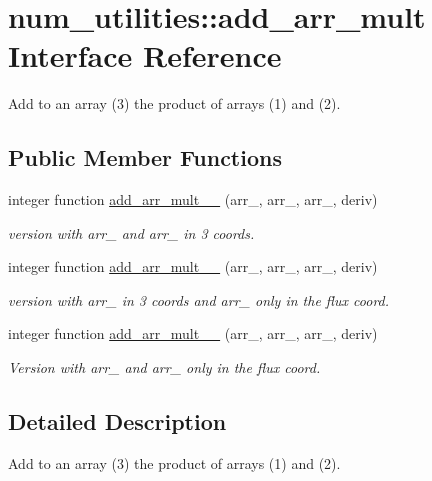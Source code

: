 \hypertarget{interfacenum__utilities_1_1add__arr__mult}{}\section{num\+\_\+utilities\+:\+:add\+\_\+arr\+\_\+mult Interface Reference}
\label{interfacenum__utilities_1_1add__arr__mult}


Add to an array (3) the product of arrays (1) and (2).  


\subsection*{Public Member Functions}
\begin{DoxyCompactItemize}
\item 
integer function \hyperlink{interfacenum__utilities_1_1add__arr__mult_a377e810d6da5185289008c0eb547db9a}{add\+\_\+arr\+\_\+mult\+\_\+\_} (arr\+\_, arr\+\_, arr\+\_, deriv)
\begin{DoxyCompactList}\small\item\em version with {\ttfamily arr\+\_} and {\ttfamily arr\+\_} in 3 coords. \end{DoxyCompactList}\item 
integer function \hyperlink{interfacenum__utilities_1_1add__arr__mult_ab295a49037477209b1d658e3c3e99dda}{add\+\_\+arr\+\_\+mult\+\_\+\_} (arr\+\_, arr\+\_, arr\+\_, deriv)
\begin{DoxyCompactList}\small\item\em version with {\ttfamily arr\+\_} in 3 coords and {\ttfamily arr\+\_} only in the flux coord. \end{DoxyCompactList}\item 
integer function \hyperlink{interfacenum__utilities_1_1add__arr__mult_a61e9ce82de87924edbbdfd8fc212998d}{add\+\_\+arr\+\_\+mult\+\_\+\_} (arr\+\_, arr\+\_, arr\+\_, deriv)
\begin{DoxyCompactList}\small\item\em Version with {\ttfamily arr\+\_} and {\ttfamily arr\+\_} only in the flux coord. \end{DoxyCompactList}\end{DoxyCompactItemize}


\subsection{Detailed Description}
Add to an array (3) the product of arrays (1) and (2). 

